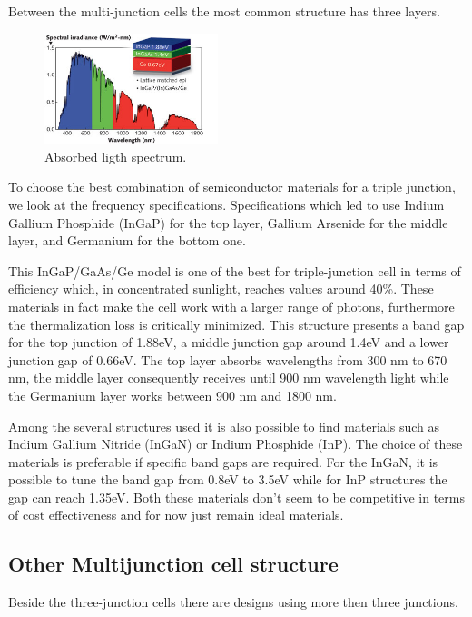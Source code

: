 \documentclass[11pt]{article} %
\begin{document}
Between the multi-junction cells the most common structure has three layers.  

\begin{figure}
	\centering
	\includegraphics[width=0.45\textwidth]{img/1212LFW04f2.jpg}
	\caption{Absorbed ligth spectrum.}
	\vspace{-70pt}
\end{figure}

To choose the best combination of semiconductor materials for a triple junction, we look at the frequency specifications. Specifications which led to use Indium Gallium Phosphide (InGaP) for the top layer, Gallium Arsenide for the middle layer, and Germanium for the bottom one. 

This InGaP/GaAs/Ge model is one of the best for triple-junction cell in terms of efficiency which, in concentrated sunlight, reaches values around 40\%. These materials in fact make the cell work with a larger range of photons, furthermore the thermalization loss is critically minimized. This structure presents a band gap for the top junction of 1.88eV, a middle junction gap around 1.4eV and a lower junction gap of 0.66eV. The top layer absorbs wavelengths from 300 nm to 670 nm, the middle layer consequently receives until 900 nm wavelength light while the Germanium layer works between 900 nm and 1800 nm. 

Among the several structures used it is also possible to find materials such as Indium Gallium Nitride (InGaN) or Indium Phosphide (InP). The choice of these materials is preferable if specific band gaps are required. For the InGaN, it is possible to tune the band gap from 0.8eV to 3.5eV while for InP structures the gap can reach 1.35eV. Both these materials don't seem to be competitive in terms of cost effectiveness and for now just remain ideal materials.

\subsection{Other Multijunction cell structure}

Beside the three-junction cells there are designs using more then three junctions.  
\end{document}

